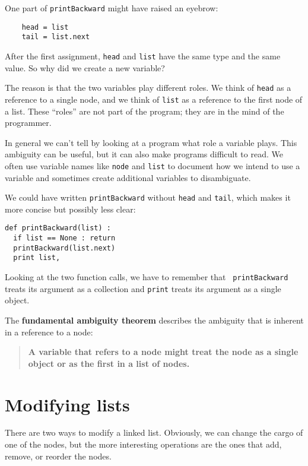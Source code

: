 One part of {\tt printBackward} might have raised
an eyebrow:

\beforeverb
\begin{verbatim}
    head = list
    tail = list.next
\end{verbatim}
\afterverb
%
After the first assignment, {\tt head} and {\tt list} have the same
type and the same value.  So why did we create a new variable?

The reason is that the two variables play different roles.  We think
of {\tt head} as a reference to a single node, and we think of
{\tt list} as a reference to the first node of a list.  These
``roles'' are not part of the program; they are in the mind of the
programmer.


In general we can't tell by looking at a program what role a
variable plays.
This ambiguity can be useful, but it can also make programs
difficult to read.  We often use variable names like {\tt node}
and {\tt list} to document how we intend to use a variable and
sometimes create additional variables to disambiguate.

We could have written {\tt printBackward} without {\tt head}
and {\tt tail}, which makes it more concise but possibly
less clear:

\beforeverb
\begin{verbatim}
def printBackward(list) :
  if list == None : return
  printBackward(list.next)
  print list,
\end{verbatim}
\afterverb
%
Looking at the two function calls, we have to remember that {\tt
printBackward} treats its argument as a collection and {\tt print}
treats its argument as a single object.

The {\bf fundamental ambiguity theorem} describes the ambiguity
that is inherent in a reference to a node:

\begin{quote}
{\bf A variable that refers to a node might treat the node as a single
object or as the first in a list of nodes.}
\end{quote}



\section{Modifying lists}

There are two ways to modify a linked list.  Obviously, we can change
the cargo of one of the nodes, but the more interesting operations are
the ones that add, remove, or reorder the nodes.

